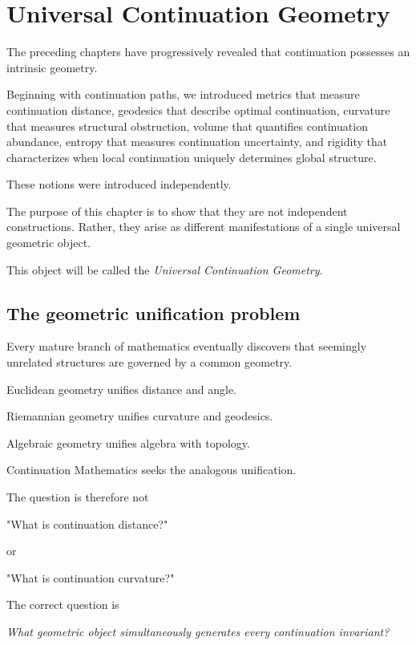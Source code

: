\documentclass[13pt,openany]{book}
\theoremstyle{plain}
\theoremstyle{definition}
\begin{document}
\chapter{Universal Continuation Geometry}

The preceding chapters have progressively revealed that continuation possesses an intrinsic geometry.

Beginning with continuation paths, we introduced metrics that measure continuation distance, geodesics that describe optimal continuation, curvature that measures structural obstruction, volume that quantifies continuation abundance, entropy that measures continuation uncertainty, and rigidity that characterizes when local continuation uniquely determines global structure.

These notions were introduced independently.

The purpose of this chapter is to show that they are not independent constructions. Rather, they arise as different manifestations of a single universal geometric object.

This object will be called the \emph{Universal Continuation Geometry}.


\section{The geometric unification problem}

Every mature branch of mathematics eventually discovers that seemingly unrelated structures are governed by a common geometry.

Euclidean geometry unifies distance and angle.

Riemannian geometry unifies curvature and geodesics.

Algebraic geometry unifies algebra with topology.

Continuation Mathematics seeks the analogous unification.

The question is therefore not

\begin{center}
"What is continuation distance?"

or

"What is continuation curvature?"
\end{center}

The correct question is

\begin{center}
\emph{What geometric object simultaneously generates every continuation invariant?}
\end{center}
\end{document}
